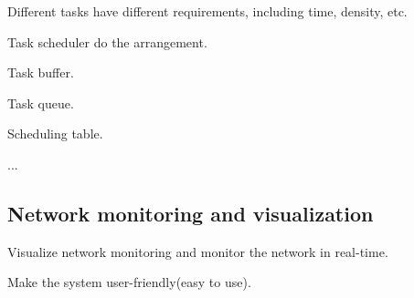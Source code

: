 Different tasks have different requirements, including time, density, etc.

Task scheduler do the arrangement. 

Task buffer.

Task queue.

Scheduling table.

...

\subsection{Network monitoring and visualization}

Visualize network monitoring and monitor the network in real-time.

Make the system user-friendly(easy to use).
